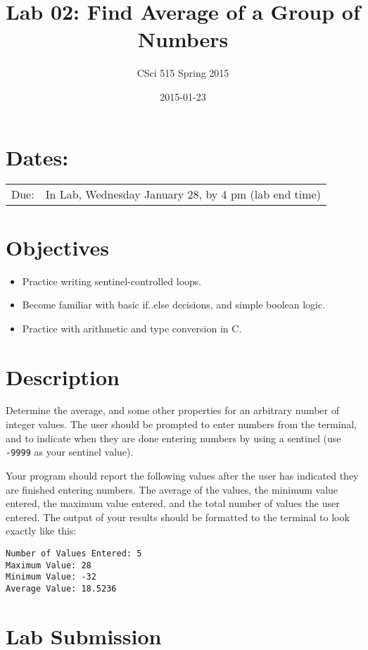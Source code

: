 \documentclass[11pt]{article}
\title{Lab 02: Find Average of a Group of Numbers}
\author{CSci 515 Spring 2015}
\date{2015-01-23}
\begin{document}
\maketitle


\section*{Dates:}
\label{sec-1}


\begin{center}
\begin{tabular}{ll}
 Due:  &  In Lab, Wednesday January 28, by 4 pm (lab end time)  \\
\end{tabular}
\end{center}
\section*{Objectives}
\label{sec-2}

\begin{itemize}
\item Practice writing sentinel-controlled loops.
\item Become familiar with basic if..else decisions, and simple boolean logic.
\item Practice with arithmetic and type conversion in C.
\end{itemize}
\section*{Description}
\label{sec-3}

Determine the average, and some other properties for an arbitrary
number of integer values.  The user should be prompted to enter
numbers from the terminal, and to indicate when they are done entering
numbers by using a sentinel (use \verb~-9999~ as your sentinel value).

Your program should report the following values after the user has
indicated they are finished entering numbers.  The average of the
values, the minimum value entered, the maximum value entered, and the
total number of values the user entered.  The output of your results
should be formatted to the terminal to look exactly like this:


\begin{verbatim}
Number of Values Entered: 5
Maximum Value: 28
Minimum Value: -32
Average Value: 18.5236
\end{verbatim}
\section*{Lab Submission}
\label{sec-4}
\end{document}
